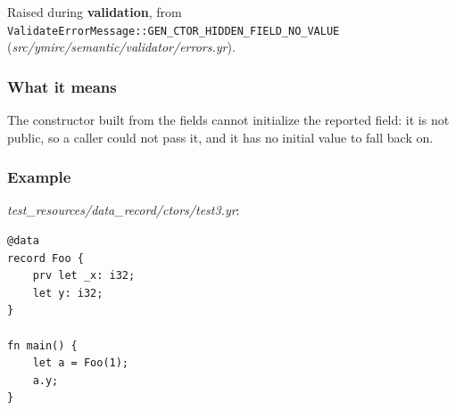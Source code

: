 \label{sec:codes:e4079}

Raised during \textbf{validation}, from \texttt{ValidateErrorMessage::\allowbreak{}GEN\_\allowbreak{}CTOR\_\allowbreak{}HIDDEN\_\allowbreak{}FIELD\_\allowbreak{}NO\_\allowbreak{}VALUE} (\textit{src/\allowbreak{}ymirc/\allowbreak{}semantic/\allowbreak{}validator/\allowbreak{}errors.yr}).

\subsubsection*{What it means}

The constructor built from the fields cannot initialize the reported field: it is not public, so a caller could not pass it, and it has no initial value to fall back on.

\subsubsection*{Example}

\textit{test\_\allowbreak{}resources/\allowbreak{}data\_\allowbreak{}record/\allowbreak{}ctors/\allowbreak{}test3.yr}:

\begin{lstlisting}[style=coloredverbatimError]
@data
record Foo {
    prv let _x: i32;
    let y: i32;
}

fn main() {
    let a = Foo(1);
    a.y;
}
\end{lstlisting}

